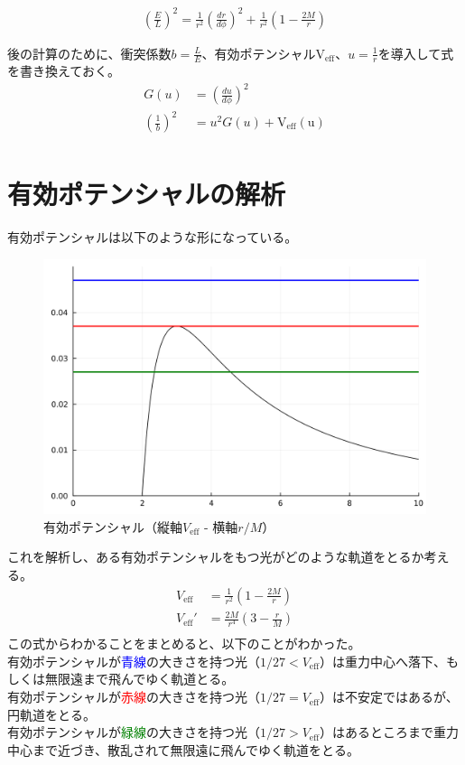 \documentclass[dvipdfmx]{report} %
\begin{document}
\begin{tcolorbox}[title=シュバルツシルト時空における光の軌道を表す方程式]
\begin{eqnarray*}
	\left( \frac{E}{L} \right)^2 =
		\frac{1}{r^2} \left( \frac{dr}{d\phi} \right)^2
		+ \frac{1}{r^2} \left( 1 - \frac{2M}{r} \right)
\end{eqnarray*}
\end{tcolorbox}
後の計算のために、衝突係数$b = \frac{L}{E}$、有効ポテンシャル$\mathrm{V_{eff}}$、$u=\frac{1}{r}$を導入して式を書き換えておく。
\begin{equation*}
\begin{split}
	G(u) 	&= \left( \frac{du}{d\phi} \right)^2\\ 
	\left( \frac{1}{b} \right)^2 &=
			u^2 G(u) + \mathrm{V_{eff}(u)}\\
\end{split}
\end{equation*}

\section{有効ポテンシャルの解析}
有効ポテンシャルは以下のような形になっている。
\begin{figure}[H]
    \centering
    \includegraphics[width=0.5\columnwidth]{./images/schwa/v-eff.png}
    \caption{有効ポテンシャル（縦軸$V_{\mathrm{eff}}$ - 横軸$r/M$）}
    \label{}
\end{figure}
これを解析し、ある有効ポテンシャルをもつ光がどのような軌道をとるか考える。
\begin{equation*}
\begin{split}
	V_{\mathrm{eff}} &= \frac{1}{r^2} \left( 1 - \frac{2M}{r} \right) \\
	V_{\mathrm{eff}}' &= \frac{2M}{r^4} \left( 3 - \frac{r}{M} \right) \\
\end{split}
\end{equation*}
この式からわかることをまとめると、以下のことがわかった。\\
有効ポテンシャルが\textcolor{blue}{青線}の大きさを持つ光（$1/27 < V_{\mathrm{eff}}$）は重力中心へ落下、もしくは無限遠まで飛んでゆく軌道とる。\\
有効ポテンシャルが\textcolor{red}{赤線}の大きさを持つ光（$1/27 = V_{\mathrm{eff}}$）は不安定ではあるが、円軌道をとる。\\
有効ポテンシャルが\textcolor{green}{緑線}の大きさを持つ光（$1/27 > V_{\mathrm{eff}}$）はあるところまで重力中心まで近づき、散乱されて無限遠に飛んでゆく軌道をとる。\\
\end{document}
